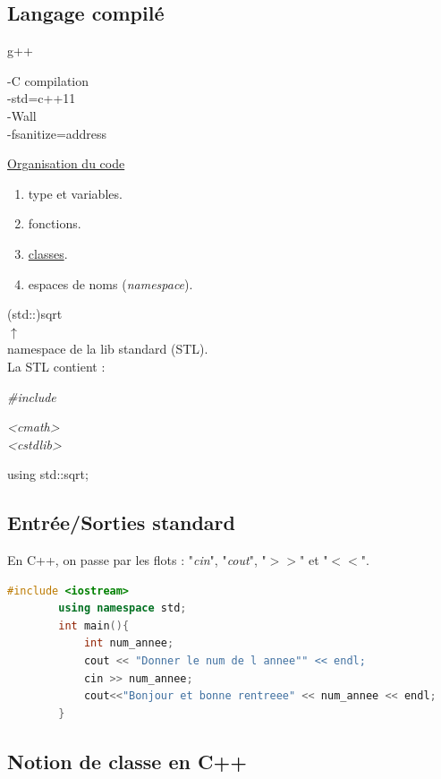 \documentclass[12pt,a4paper]{article}
\begin{document}
	\subsection{Langage compilé}
	
	g++ \begin{minipage}[t]{15cm}
		-C compilation\\
		-std=c++11\\
		-Wall\\
		-fsanitize=address
	\end{minipage}
	
	\underline{Organisation du code}
	\begin{enumerate}[label=-]
		\item type et variables.
		\item fonctions.
		\item \underline{classes}.
		\item espaces de noms (\textit{namespace}).
	\end{enumerate}
	(std::)sqrt\\
	$\uparrow$\\
	namespace de la lib standard (STL).\\
	
	La STL contient : \begin{minipage}[t]{15cm}
		\textit{\#include} \begin{minipage}[t]{15cm}
			\textit{<cmath>}\\
			\textit{<cstdlib>}
		\end{minipage}
		
		using std::sqrt;
	\end{minipage}
	
	\subsection{Entrée/Sorties standard}
	En C++, on passe par les flots : "\textit{cin}", "\textit{cout}", "$>>$" et "$<<$".
	

	\begin{lstlisting}[language=C++, caption=Exemple de code en C++]
		#include <iostream>
		using namespace std;
		int main(){
			int num_annee;
			cout << "Donner le num de l annee"" << endl;
			cin >> num_annee;
			cout<<"Bonjour et bonne rentreee" << num_annee << endl;
		}
	\end{lstlisting}
	
	\newpage

	\subsection{Notion de classe en C++}
	
\end{document}
